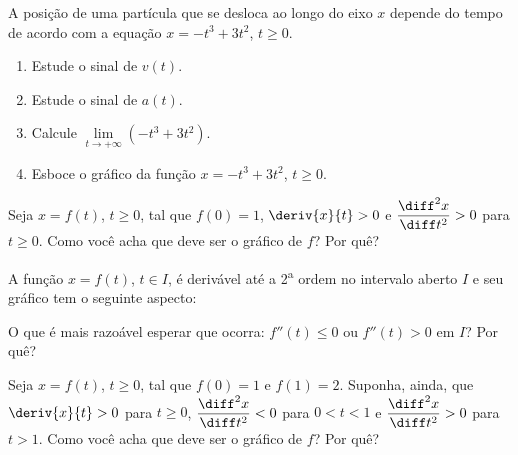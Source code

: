 \begin{exercicio}[3]
A posição de uma partícula que se desloca ao longo do eixo $x$ depende do tempo de acordo com a equação $x = -t^3 + 3t^2$, $t \ge 0$.
\begin{enumerate}[label=\alph*)]
    \item Estude o sinal de $v(t)$.
    \item Estude o sinal de $a(t)$.
    \item Calcule $\lim\limits_{t \to +\infty} (-t^3 + 3t^2)$.
    \item Esboce o gráfico da função $x = -t^3 + 3t^2$, $t \ge 0$.
\end{enumerate}
\end{exercicio}

\begin{exercicio}[4]
Seja $x = f(t)$, $t \ge 0$, tal que $f(0) = 1$, $\deriv{x}{t} > 0$ e $\dfrac{\diff^2 x}{\diff t^2} > 0$ para $t \ge 0$. Como você acha que deve ser o gráfico de $f$? Por quê?
\end{exercicio}

\begin{exercicio}[5]
A função $x = f(t)$, $t \in I$, é derivável até a 2\textsuperscript{a} ordem no intervalo aberto $I$ e seu gráfico tem o seguinte aspecto:

\begin{center}
\end{center}

O que é mais razoável esperar que ocorra: $f''(t) \le 0$ ou $f''(t) > 0$ em $I$? Por quê?
\end{exercicio}

\begin{exercicio}[6]
Seja $x = f(t)$, $t \ge 0$, tal que $f(0) = 1$ e $f(1) = 2$. Suponha, ainda, que $\deriv{x}{t} > 0$ para $t \ge 0$, $\dfrac{\diff^2x}{\diff t^2} < 0$ para $0 < t < 1$ e $\dfrac{\diff^2x}{\diff t^2} > 0$ para $t > 1$. Como você acha que deve ser o gráfico de $f$? Por quê?
\end{exercicio}

